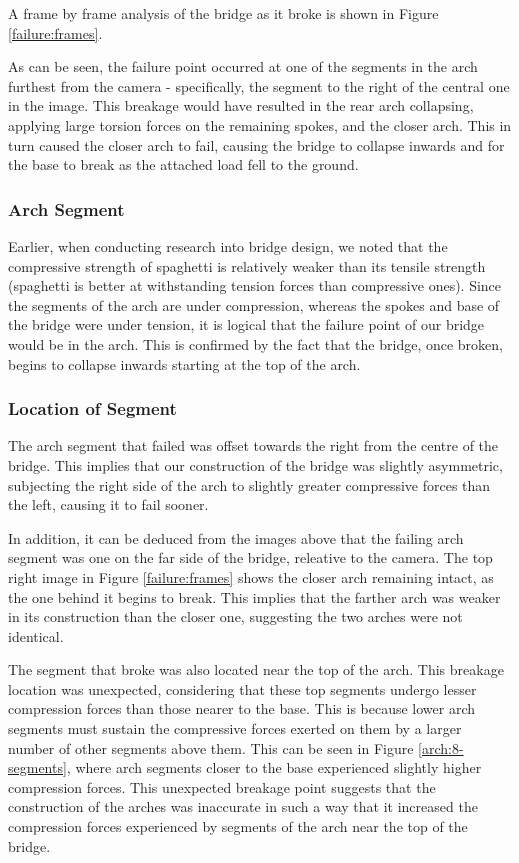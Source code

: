 \documentclass[a4paper,11pt]{article}
\begin{document}
A frame by frame analysis of the bridge as it broke is shown in Figure
\ref{failure:frames}.

As can be seen, the failure point occurred at one of the segments in the arch
furthest from the camera - specifically, the segment to the right of the
central one in the image.
This breakage would have resulted in the rear arch collapsing, applying large
torsion forces on the remaining spokes, and the closer arch.
This in turn caused the closer arch to fail, causing the bridge to collapse
inwards and for the base to break as the attached load fell to the ground.


\subsubsection{Arch Segment}

Earlier, when conducting research into bridge design, we noted that the
compressive strength of spaghetti is relatively weaker than its tensile
strength (spaghetti is better at withstanding tension forces than compressive
ones).
Since the segments of the arch are under compression, whereas the spokes and
base of the bridge were under tension, it is logical that the failure point of
our bridge would be in the arch.
This is confirmed by the fact that the bridge, once broken, begins to collapse
inwards starting at the top of the arch.


\subsubsection{Location of Segment}

The arch segment that failed was offset towards the right from the centre of
the bridge.
This implies that our construction of the bridge was slightly asymmetric,
subjecting the right side of the arch to slightly greater compressive forces
than the left, causing it to fail sooner.

In addition, it can be deduced from the images above that the failing arch
segment was one on the far side of the bridge, releative to the camera.
The top right image in Figure \ref{failure:frames} shows the closer arch
remaining intact, as the one behind it begins to break.
This implies that the farther arch was weaker in its construction than the
closer one, suggesting the two arches were not identical.

The segment that broke was also located near the top of the arch.
This breakage location was unexpected, considering that these top segments
undergo lesser compression forces than those nearer to the base.
This is because lower arch segments must sustain the compressive forces exerted
on them by a larger number of other segments above them.
This can be seen in Figure \ref{arch:8-segments}, where arch segments closer to
the base experienced slightly higher compression forces.
This unexpected breakage point suggests that the construction of the arches was
inaccurate in such a way that it increased the compression forces experienced by
segments of the arch near the top of the bridge.
\end{document}

